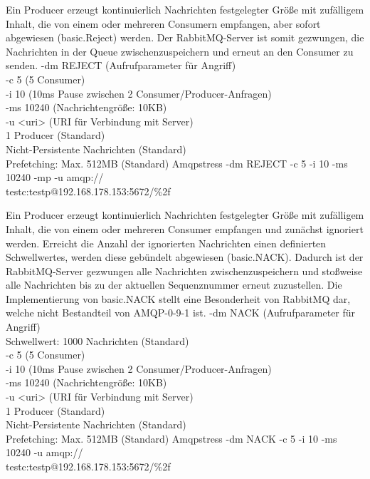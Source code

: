 \documentclass[	a4paper,
			11pt,
			oneside,
			parskip]{scrartcl}
\begin{document}
		{%
		 Ein Producer erzeugt kontinuierlich Nachrichten festgelegter Größe mit zufälligem Inhalt, die von einem oder mehreren Consumern empfangen, aber sofort abgewiesen (basic.Reject) werden.
		 Der RabbitMQ-Server ist somit gezwungen, die Nachrichten in der Queue zwischenzuspeichern und erneut an den Consumer zu senden.
		}{%
		 -dm REJECT (Aufrufparameter für Angriff) \\
		 -c 5 (5 Consumer) \\
		 -i 10 (10ms Pause zwischen 2 Consumer/Producer-Anfragen) \\
		 -ms 10240 (Nachrichtengröße: 10KB) \\
		 -u <uri> (URI für Verbindung mit Server) \\
		 1 Producer (Standard) \\
		 Nicht-Persistente Nachrichten (Standard) \\
		 Prefetching: Max. 512MB (Standard)
		}{%
		 Amqpstress -dm REJECT -c 5 -i 10 -ms 10240 -mp -u amqp://\\\hspace*{3cm}testc:testp@192.168.178.153:5672/\%2f
		}
		
	
		{%
		 Ein Producer erzeugt kontinuierlich Nachrichten festgelegter Größe mit zufälligem Inhalt, die von einem oder mehreren Consumer empfangen und zunächst ignoriert werden. Erreicht die Anzahl der 
		 ignorierten Nachrichten einen definierten Schwellwertes, werden diese gebündelt abgewiesen (basic.NACK). Dadurch ist der RabbitMQ-Server gezwungen alle Nachrichten zwischenzuspeichern und stoßweise alle Nachrichten bis zu der aktuellen Sequenznummer erneut zuzustellen. Die Implementierung von basic.NACK stellt eine Besonderheit von RabbitMQ dar, welche nicht Bestandteil von AMQP-0-9-1 ist.
		}{%
		 -dm NACK (Aufrufparameter für Angriff) \\
		 Schwellwert: 1000 Nachrichten (Standard) \\
		 -c 5 (5 Consumer) \\
		 -i 10 (10ms Pause zwischen 2 Consumer/Producer-Anfragen) \\
		 -ms 10240 (Nachrichtengröße: 10KB) \\
		 -u <uri> (URI für Verbindung mit Server) \\
		 1 Producer (Standard) \\
		 Nicht-Persistente Nachrichten (Standard) \\
		 Prefetching: Max. 512MB (Standard)
		}{%
		 Amqpstress -dm NACK -c 5 -i 10 -ms 10240 -u amqp://\\\hspace*{3cm}testc:testp@192.168.178.153:5672/\%2f
		}
		
\end{document}

